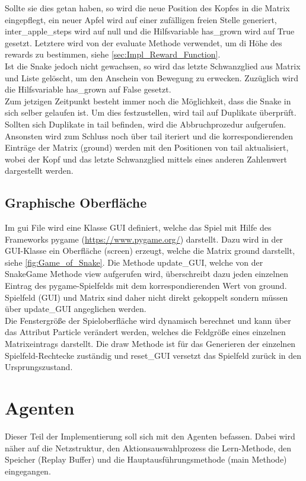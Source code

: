 Sollte sie dies getan haben, so wird die neue Position des Kopfes in die Matrix eingepflegt, ein neuer Apfel wird auf einer zufälligen freien Stelle generiert, inter\_apple\_steps wird auf null und die Hilfsvariable has\_grown wird auf True gesetzt. Letztere wird von der evaluate Methode verwendet, um di Höhe des rewards zu bestimmen, siehe \ref{sec:Impl_Reward_Function}.\\
Ist die Snake jedoch nicht gewachsen, so wird das letzte Schwanzglied aus Matrix und Liste gelöscht, um den Anschein von Bewegung zu erwecken. Zuzüglich wird  die Hilfsvariable has\_grown auf False gesetzt.\\
Zum jetzigen Zeitpunkt besteht immer noch die Möglichkeit, dass die Snake in sich selber gelaufen ist. Um dies festzustellen, wird tail auf Duplikate überprüft. Sollten sich Duplikate in tail befinden, wird die Abbruchprozedur aufgerufen.\\
Ansonsten wird zum Schluss noch über tail iteriert und die korrespondierenden Einträge der Matrix (ground) werden mit den Positionen von tail aktualisiert, wobei der Kopf und das letzte Schwanzglied mittels eines anderen Zahlenwert dargestellt werden.

\subsection{Graphische Oberfläche} \label{sec:Impl_GUI}
Im gui File wird eine Klasse GUI definiert, welche das Spiel mit Hilfe des Frameworks pygame (\url{https://www.pygame.org/}) darstellt. Dazu wird in der GUI-Klasse ein Oberfläche (screen) erzeugt, welche die Matrix ground darstellt, siehe \ref{fig:Game_of_Snake}. 
Die Methode update\_GUI, welche von der SnakeGame Methode view aufgerufen wird, überschreibt dazu jeden einzelnen Eintrag des pygame-Spielfelds mit dem korrespondierenden Wert von ground. 
Spielfeld (GUI) und Matrix sind daher nicht direkt gekoppelt sondern müssen über update\_GUI angeglichen werden.\\
Die Fenstergröße der Spieloberfläche wird dynamisch berechnet und kann über das Attribut Particle verändert werden, welches die Feldgröße eines einzelnen Matrixeintrags darstellt. 
Die draw Methode ist für das Generieren der einzelnen Spielfeld-Rechtecke zuständig und reset\_GUI versetzt das Spielfeld zurück in den Ursprungszustand.


\section{Agenten}
Dieser Teil der Implementierung soll sich mit den Agenten befassen. Dabei wird näher auf die Netzstruktur, den Aktionsauswahlprozess die Lern-Methode, den Speicher (Replay Buffer) und die Hauptausführungsmethode (main Methode) eingegangen.

